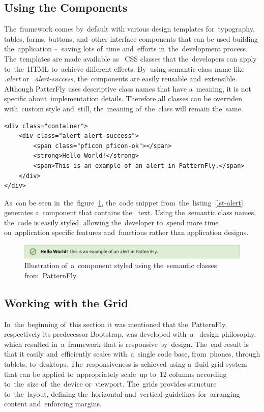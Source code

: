 \subsection{Using the Components}
The~framework comes by~default with various design templates for~typography,
tables, forms, buttons, and~other interface components that can be used building
the~application --~saving lots of~time and~efforts in~the~development process.
The~templates are made available as~ CSS classes that
the~developers can apply to~the~HTML to~achieve different effects. By~using
semantic class name like \textit{.alert} or~\textit{.alert-success},
the~components are easily reusable and~extensible. Although PatterFly uses
descriptive class names that have a~meaning, it is not specific
about~implementation details. Therefore all classes can be overriden with~custom
style and~still, the~meaning of~the~class will remain the~same.

\vspace{1mm}
\begin{lstlisting}[caption=An~example of~styling the~component using predefined
class \textit{.alert}., label=lst-alert, style=dp-html]
<div class="container">
	<div class="alert alert-success">
		<span class="pficon pficon-ok"></span>
		<strong>Hello World!</strong>
		<span>This is an example of an alert in PatternFly.</span>
	</div>
</div>
\end{lstlisting}

As~can be seen in~the~figure~\ref{fig-alert}, the~code snippet
from~the~listing~\ref{lst-alert} generates a~component that contains
the~ text. Using the~semantic class names, the~code is easily
styled, allowing the~developer to~spend more time on~application specific
features and~functions rather than application designs.

\begin{figure}[!hbt]
	\centering
	\includegraphics[scale=0.8]{./figures/patternfly-alert.pdf}
	\caption{Illustration of~a~component styled using the~semantic classes
	from~PatternFly.}
	\label{fig-alert}
\end{figure}

\subsection{Working with the Grid}
In~the~beginning of~this section it was mentioned that the~PatternFly, respectively
its predecessor Bootstrap, was developed with~a~ design
philosophy, which resulted in~a~framework that is responsive by~design. The~end
result is that it easily and~efficiently scales with~a~single code base,
from~phones, through tablets, to~desktops. The~responsiveness is achieved using
a~fluid grid system that can be applied to~appropriately scale~up to~12 columns
according to~the~size of~the~device or~viewport. The~grids provides structure
to~the~layout, defining the~horizontal and~vertical guidelines for~arranging
content and~enforcing margins.


